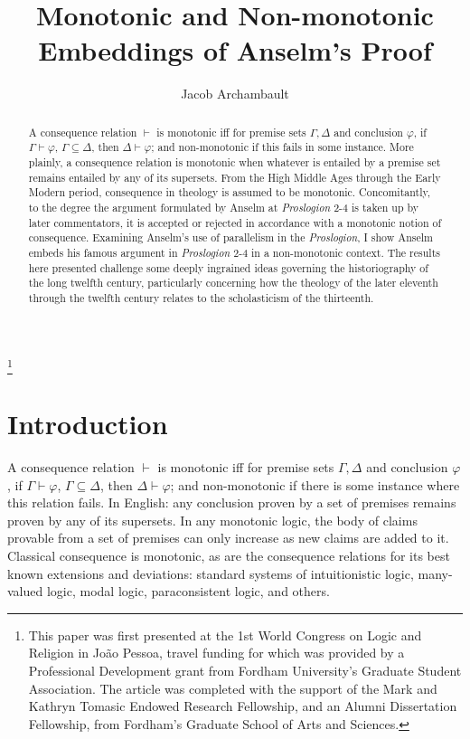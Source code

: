 \documentclass[]{birkjour}
\begin{document}
	
	\title{Monotonic and Non-monotonic Embeddings of Anselm's Proof}
	\author{Jacob Archambault}
	\address{
		Fordham University \\
		441 E. Fordham Rd \\
		Bronx, NY 10458 \\
		United States of America}
	
	\begin{abstract}
A consequence relation $\vdash$ is monotonic iff for premise sets $\Gamma, \Delta$ and conclusion $\varphi$, if $\Gamma \vdash \varphi$, $\Gamma \subseteq \Delta$, then $\Delta \vdash \varphi$; and non-monotonic if this fails in some instance.  More plainly, a consequence relation is monotonic when whatever is entailed by a premise set remains entailed by any of its supersets. From the High Middle Ages through the Early Modern period, consequence in theology is assumed to be monotonic. Concomitantly, to the degree the argument formulated by Anselm at \textit{Proslogion} 2-4 is taken up by later commentators, it is accepted or rejected in accordance with a monotonic notion of consequence. Examining Anselm's use of parallelism in the \textit{Proslogion}, I show Anselm embeds his famous argument in \textit{Proslogion} 2-4 in a non-monotonic context. The results here presented challenge some deeply ingrained ideas governing the historiography of the long twelfth century, particularly concerning how the theology of the later eleventh through the twelfth century relates to the scholasticism of the thirteenth.
	\end{abstract}
\thanks{This paper was first presented at the 1st World Congress on Logic and Religion in Jo\~{a}o Pessoa, travel funding for which was provided by a Professional Development grant from Fordham University's Graduate Student Association. The article was completed with the support of the Mark and Kathryn Tomasic Endowed Research Fellowship, and an Alumni Dissertation Fellowship, from Fordham's Graduate School of Arts and Sciences.}
\maketitle
	
\section{Introduction}
A consequence relation $\vdash$ is monotonic iff for premise sets $\Gamma, \Delta$ and conclusion $\varphi$, if $\Gamma \vdash \varphi$, $\Gamma \subseteq \Delta$, then $\Delta \vdash \varphi$; and non-monotonic if there is some instance where this relation fails. In English: any conclusion proven by a set of premises remains proven by any of its supersets. In any monotonic logic, the body of claims provable from a set of premises can only increase as new claims are added to it. Classical consequence is monotonic, as are the consequence relations for its best known extensions and deviations: standard systems of intuitionistic logic, many-valued logic, modal logic, paraconsistent logic, and others.
	
\end{document}
